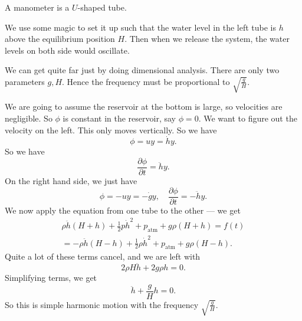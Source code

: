 \documentclass[a4paper]{article}
\begin{document}
\begin{eg}
  A manometer is a $U$-shaped tube.
  \begin{center}
  \end{center}
  We use some magic to set it up such that the water level in the left tube is $h$ above the equilibrium position $H$. Then when we release the system, the water levels on both side would oscillate.

  We can get quite far just by doing dimensional analysis. There are only two parameters $g, H$. Hence the frequency must be proportional to $\sqrt{\frac{g}{H}}$.

  We are going to assume the reservoir at the bottom is large, so velocities are negligible. So $\phi$ is constant in the reservoir, say $\phi = 0$. We want to figure out the velocity on the left. This only moves vertically. So we have
  \[
    \phi = uy = \dot{h}y.
  \]
  So we have
  \[
    \frac{\partial \phi}{\partial t} = \ddot{h}y.
  \]
  On the right hand side, we just have
  \[
    \phi = -uy = -\dot{g} y,\quad \frac{\partial \phi}{\partial t} = -\ddot{h}y.
  \]
  We now apply the equation from one tube to the other --- we get
  \begin{multline*}
    \rho \ddot{h} (H + h) + \frac{1}{2}p \dot{h}^2 + p_{\mathrm{atm}} + g\rho(H + h) = f(t) \\
    = -\rho\ddot{h}(H - h) + \frac{1}{2}\rho \dot{h}^2 + p_{\mathrm{atm}} + g\rho(H - h).
  \end{multline*}
  Quite a lot of these terms cancel, and we are left with
  \[
    2 \rho H\ddot{h} + 2g\rho h = 0.
  \]
  Simplifying terms, we get
  \[
    \ddot{h} + \frac{g}{H} h = 0.
  \]
  So this is simple harmonic motion with the frequency $\sqrt{\frac{g}{H}}$.
\end{eg}
\end{document}
